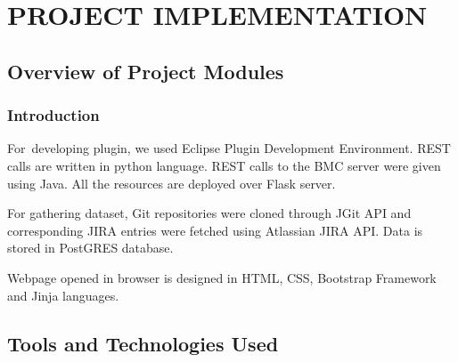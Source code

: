 \documentclass[oneside,a4paper,12pt]{book}
\begin{document}

\newpage


\pagebreak\par

\chapter{PROJECT IMPLEMENTATION}


\vspace{\baselineskip}



 
\section{Overview of Project Modules}

\subsection{Introduction}


\begin{justify}
\tab For\ developing plugin, we used Eclipse Plugin Development Environment. REST calls are written in python language. REST calls  to the BMC server were given using Java. All the resources are deployed over Flask server. 
\end{justify}\par

\begin{justify}
\tab For gathering dataset, Git repositories were cloned through JGit API and corresponding JIRA entries were fetched using Atlassian JIRA API. Data is stored in PostGRES database. 
\end{justify}\par

\begin{justify}
\tab Webpage opened in browser is designed in HTML, CSS, Bootstrap Framework and Jinja languages.
\end{justify}\par


\section{Tools and Technologies Used}
\end{document}
